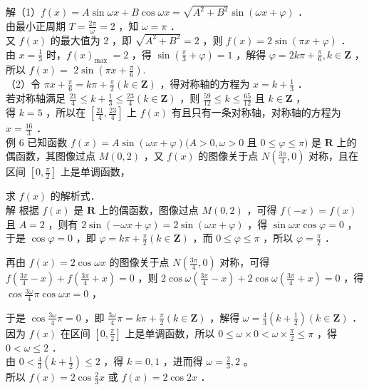 \documentclass[10pt]{article}
\begin{document}
解（1）\(f(x)=A \sin \omega x+B \cos \omega x=\sqrt{A^{2}+B^{2}} \sin (\omega x+\varphi)\) ．\\
由最小正周期 \(T=\frac{2 \pi}{\omega}=2\) ，知 \(\omega=\pi\) ．\\
又 \(f(x)\) 的最大值为 2 ，即 \(\sqrt{A^{2}+B^{2}}=2\) ，则 \(f(x)=2 \sin (\pi x+\varphi)\) ．\\
由 \(x=\frac{1}{3}\) 时，\(f(x)_{\text {max }}=2\) ，得 \(\sin \left(\frac{\pi}{3}+\varphi\right)=1\) ，解得 \(\varphi=2 k \pi+\frac{\pi}{6}, k \in \mathbf{Z}\) ，所以 \(f(x)=\) \(2 \sin \left(\pi x+\frac{\pi}{6}\right)\).\\
（2）令 \(\pi x+\frac{\pi}{6}=k \pi+\frac{\pi}{2}(k \in \mathbf{Z})\) ，得对称轴的方程为 \(x=k+\frac{1}{3}\) ．\\
若对称轴满足 \(\frac{21}{4} \leqslant k+\frac{1}{3} \leqslant \frac{23}{4}(k \in \mathbf{Z})\) ，则 \(\frac{59}{12} \leqslant k \leqslant \frac{65}{12}\) 且 \(k \in \mathbf{Z}\) ，\\
得 \(k=5\) ，所以在 \(\left[\frac{21}{4}, \frac{23}{4}\right]\) 上 \(f(x)\) 有且只有一条对称轴，对称轴的方程为 \(x=\frac{16}{3}\) ．\\
例 6 已知函数 \(f(x)=A \sin (\omega x+\varphi)(A>0, \omega>0\) 且 \(0 \leqslant \varphi \leqslant \pi)\) 是 \(\mathbf{R}\) 上的偶函数，其图像过点 \(M(0,2)\) ，又 \(f(x)\) 的图像关于点 \(N\left(\frac{3 \pi}{4}, 0\right)\) 对称，且在区间 \(\left[0, \frac{\pi}{2}\right]\) 上是单调函数，

求 \(f(x)\) 的解析式．\\
解 根据 \(f(x)\) 是 \(\mathbf{R}\) 上的偶函数，图像过点 \(M(0,2)\) ，可得 \(f(-x)=f(x)\) 且 \(A=2\) ，则有 \(2 \sin (-\omega x+\varphi)=2 \sin (\omega x+\varphi)\) ，得 \(\sin \omega x \cos \varphi=0\) ，于是 \(\cos \varphi=0\) ，即 \(\varphi=k \pi+\frac{\pi}{2}(k \in \mathbf{Z})\) ，而 \(0 \leqslant \varphi \leqslant \pi\) ，所以 \(\varphi=\frac{\pi}{2}\) ．

再由 \(f(x)=2 \cos \omega x\) 的图像关于点 \(N\left(\frac{3 \pi}{4}, 0\right)\) 对称，可得 \(f\left(\frac{3 \pi}{4}-x\right)+f\left(\frac{3 \pi}{4}+x\right)=0\) ，则 \(2 \cos \omega\left(\frac{3 \pi}{4}-x\right)+2 \cos \omega\left(\frac{3 \pi}{4}+x\right)=0\) ，得 \(\cos \frac{3 \omega}{4} \pi \cos \omega x=0\) ，

于是 \(\cos \frac{3 \omega}{4} \pi=0\) ，即 \(\frac{3 \omega}{4} \pi=k \pi+\frac{\pi}{2}(k \in \mathbf{Z})\) ，解得 \(\omega=\frac{4}{3}\left(k+\frac{1}{2}\right)(k \in \mathbf{Z})\) ．\\
因为 \(f(x)\) 在区间 \(\left[0, \frac{\pi}{2}\right]\) 上是单调函数，所以 \(0 \leqslant \omega \times 0<\omega \times \frac{\pi}{2} \leqslant \pi\) ，得 \(0<\omega \leqslant 2\) ．\\
由 \(0<\frac{4}{3}\left(k+\frac{1}{2}\right) \leqslant 2\) ，得 \(k=0,1\) ，进而得 \(\omega=\frac{2}{3}, 2\) 。\\
所以 \(f(x)=2 \cos \frac{2}{3} x\) 或 \(f(x)=2 \cos 2 x\) ．
\end{document}
